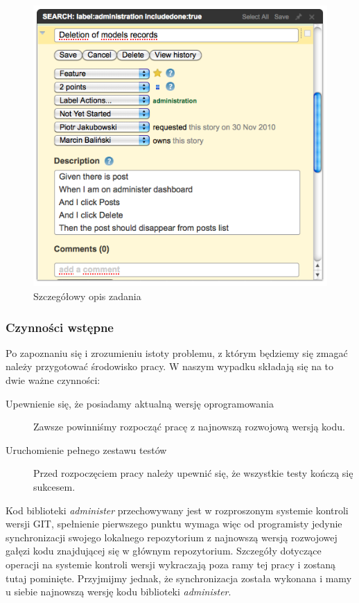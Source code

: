     \begin{figure}[h]
  		\begin{center}
  			\includegraphics[width=\linewidth]{images/administer_story_desc.png}
  			\caption{Szczegółowy opis zadania}
  			\label{administer_story_desc}
  		\end{center}
  	\end{figure}
  	
  	\subsubsection{Czynności wstępne}
  	
  	Po zapoznaniu się i zrozumieniu istoty problemu, z którym będziemy się zmagać należy przygotować środowisko pracy. W naszym wypadku składają się na to dwie ważne czynności:
  	
  	 \begin{description}
        \item[Upewnienie się, że posiadamy aktualną wersję oprogramowania] Zawsze powinniśmy rozpocząć pracę z najnowszą rozwojową wersją kodu.
        \item[Uruchomienie pełnego zestawu testów] Przed rozpoczęciem pracy należy upewnić się, że wszystkie testy kończą się sukcesem.
      \end{description}
      
    Kod biblioteki \emph{administer} przechowywany jest w rozproszonym systemie kontroli wersji GIT, spełnienie pierwszego punktu wymaga więc od programisty jedynie synchronizacji swojego lokalnego repozytorium z najnowszą wersją rozwojowej gałęzi kodu znajdującej się w głównym repozytorium. Szczegóły dotyczące operacji na systemie kontroli wersji wykraczają poza ramy tej pracy i zostaną tutaj pominięte. Przyjmijmy jednak, że synchronizacja została wykonana i mamy u siebie najnowszą wersję kodu biblioteki \emph{administer}. 
    
